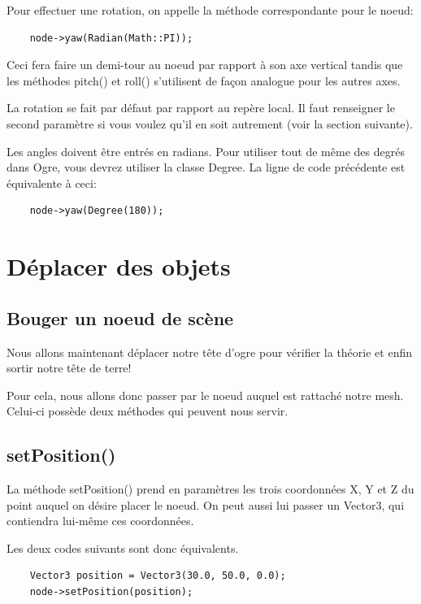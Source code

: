 Pour effectuer une rotation, on appelle la méthode correspondante pour le noeud:
\begin{lstlisting}
	node->yaw(Radian(Math::PI));
\end{lstlisting}

Ceci fera faire un demi-tour au noeud par rapport à son axe vertical tandis que les méthodes pitch() et roll() s'utilisent de fa\c{c}on analogue pour les autres axes.

La rotation se fait par défaut par rapport au repère local. Il faut renseigner le second paramètre si vous voulez qu'il en soit autrement (voir la section suivante).

Les angles doivent être entrés en radians. Pour utiliser tout de même des degrés dans Ogre, vous devrez utiliser la classe Degree. La ligne de code précédente est équivalente à ceci:
\begin{lstlisting}
	node->yaw(Degree(180));
\end{lstlisting}









\section{Déplacer des objets}




\subsection{Bouger un noeud de scène}

Nous allons maintenant déplacer notre tête d'ogre pour vérifier la théorie et enfin sortir notre tête de terre!

Pour cela, nous allons donc passer par le noeud auquel est rattaché notre mesh. Celui-ci possède deux méthodes qui peuvent nous servir.




\subsection{setPosition()}

La méthode setPosition() prend en paramètres les trois coordonnées X, Y et Z du point auquel on désire placer le noeud. On peut aussi lui passer un Vector3, qui contiendra lui-même ces coordonnées.

Les deux codes suivants sont donc équivalents.
\begin{lstlisting}
	Vector3 position = Vector3(30.0, 50.0, 0.0);
	node->setPosition(position);
\end{lstlisting}


